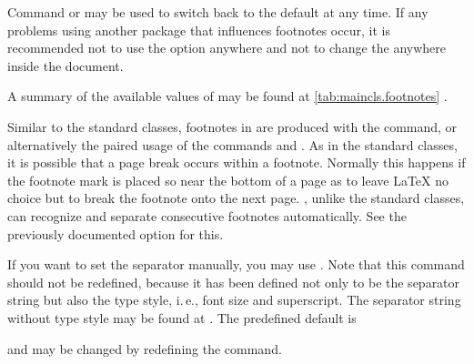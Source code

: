 Command  or  may be used to switch back
to the default  at any time. If 
any problems using another package that influences footnotes occur, it is
recommended not to use the option anywhere and not to change the
 anywhere inside the document.

A summary of the available  values of  may
be found at \autoref{tab:maincls.footnotes}%
%
.%
%
%
\EndIndexGroup


\begin{Declaration}
\end{Declaration}%
Similar to the standard classes, footnotes in {\KOMAScript} are produced
with the  command, or alternatively the paired usage of the
commands  and .  As in the standard
classes, it is possible that a page break occurs within a footnote. Normally
this happens if the footnote mark is placed so near the bottom of a page as to
leave {\LaTeX} no choice but to break the footnote onto the next page.
\KOMAScript{}, unlike the standard classes,
can recognize and separate consecutive footnotes
automatically. See the previously documented
option  for this.

If you want to set the separator manually, you may use
. Note that this command should not be
redefined, because it has been defined not only to be the separator string but
also the type style, i.\,e., font size and superscript. The separator string
without type style may be found at . The
predefined default is
\begin{lstcode}[belowskip=\dp\strutbox]
  \newcommand*{\multfootsep}{,}
\end{lstcode}
and may be changed by redefining the command.

